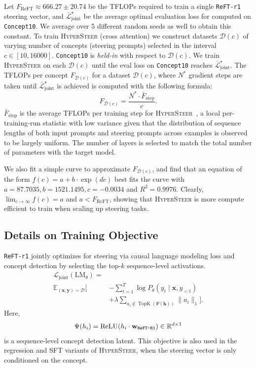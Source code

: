 \documentclass[11pt]{article}
\newcommand{\methodname}{\textsc{HyperSteer}}
\begin{document}
Let $F_\mathrm{ReFT}\approx 666.27\pm 20.74$ be the TFLOPs required to train a single \texttt{ReFT-r1} steering vector, and $\bar{\mathcal{L}}_\mathrm{joint}^\star$ be the average optimal evaluation loss for computed on \texttt{Concept10}. We average over 5 different random seeds as well to obtain this constant. To train \methodname\; (cross attention) we construct datasets $\mathcal D(c)$ of varying number of concepts (steering prompts) selected in the interval $c\in [10,16000]$. \texttt{Concept10} is \textit{held-in} with respect to $\mathcal{D}(c)$. We train \methodname\; on each $\mathcal{D}(c)$ until the eval loss on \texttt{Concept10} reaches $\bar{\mathcal{L}}_\mathrm{joint}^\star$. The TFLOPs per concept $F_{\mathcal{D}(c)}$ for a dataset $\mathcal{D}(c)$, where $N^*$ gradient steps are taken until $\bar{\mathcal{L}}_\mathrm{joint}^\star$ is achieved is computed with the following formula:
\begin{equation}
    F_{\mathcal{D}(c)} = \frac{N^*\cdot \bar{F}_\mathrm{step}}{c}.
\end{equation}
$\bar{F}_\mathrm{step}$ is the average TFLOPs per training step for \methodname\ , a local per-training-run statistic with low variance given that the distribution of sequence lengths of both input prompts and steering prompts across examples is observed to be largely uniform. The number of layers is selected to match the total number of parameters with the target model.

We also fit a simple curve to approximate $F_{\mathcal{D}(c)}$, and find that an equation of the form $f(c) = a + b\cdot \exp(dc)$ best fits the curve with $a = 87.7035, b = 1521.1495, c = -0.0034$ and $R^2 = 0.9976$. Clearly, $
\lim_{c\to\infty}f(c)=a$ and $a<F_\mathrm{ReFT}$, showing that \methodname\; is more compute efficient to train when scaling up steering tasks.


\subsection{Details on Training Objective}
\texttt{ReFT-r1} jointly optimizes for steering via causal language modeling loss and concept detection by selecting the top-$k$ sequence-level activations.
\label{sec:reft-objective}
\begin{align}
\mathcal{L}_{\text{joint}}(\mathrm{LM}_\theta) = \\
\mathbb{E}_{(\mathbf{x}, \mathbf{y}) \sim \mathcal{D}} \bigg[ 
    & - \sum_{t=1}^{T} \log P_\theta(y_t \mid \mathbf{x}, y_{<t}) \nonumber \\
    & + \lambda \sum_{a_i \notin \operatorname{TopK}(\Psi(\mathbf{h}))} \|a_i\|_1 
\bigg].
\label{eq:reft-loss}
\end{align}
Here, 
\begin{equation}
\Psi(h_i)=\mathrm{ReLU}(h_i\cdot {\bf w}_\mathrm{\texttt{ReFT-R1}})\in \mathbb R^{d\times 1}
\end{equation}
is a sequence-level concept detection latent. This objective is also used in the regression and SFT variants of \methodname, when the steering vector is only conditioned on the concept.
\end{document}
